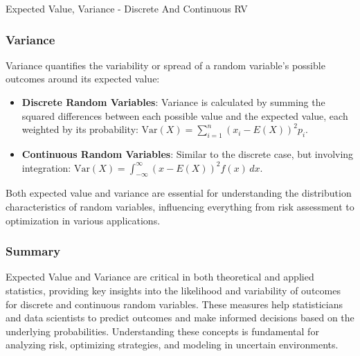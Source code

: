 \begin{notes}{Expected Value, Variance - Discrete And Continuous RV}
    \subsubsection*{Variance}
    
    Variance quantifies the variability or spread of a random variable's possible outcomes around its expected value:
    \begin{itemize}
        \item \textbf{Discrete Random Variables}: Variance is calculated by summing the squared differences between each possible value and the expected value, each weighted by its probability: $\text{Var}(X) = \sum_{i=1}^n (x_i - E(X))^2 p_i$.
        \item \textbf{Continuous Random Variables}: Similar to the discrete case, but involving integration: $\text{Var}(X) = \int_{-\infty}^{\infty} (x - E(X))^2 f(x) \, dx$.
    \end{itemize}
    
    Both expected value and variance are essential for understanding the distribution characteristics of random variables, influencing everything from risk assessment to optimization in various applications.
    
    \subsubsection*{Summary}
    
    Expected Value and Variance are critical in both theoretical and applied statistics, providing key insights into the likelihood and variability of outcomes for discrete and continuous random variables. 
    These measures help statisticians and data scientists to predict outcomes and make informed decisions based on the underlying probabilities. Understanding these concepts is fundamental for analyzing 
    risk, optimizing strategies, and modeling in uncertain environments.    
\end{notes}